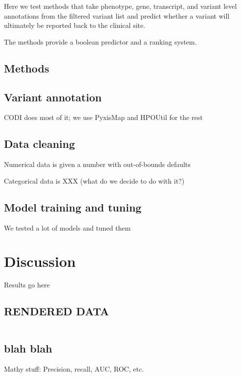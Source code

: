 \documentclass{bioinfo}
\begin{document}
Here we test methods that take phenotype, gene, transcript, and variant level annotations from the filtered variant list and predict whether a variant will ultimately be reported back to the clinical site.

The methods provide a boolean predictor and a ranking system.

\begin{methods}
\section{Methods}

\subsection{Variant annotation}
CODI does most of it; we use PyxisMap and HPOUtil for the rest

\subsection{Data cleaning}
Numerical data is given a number with out-of-bounds defaults

Categorical data is XXX (what do we decide to do with it?)

\subsection{Model training and tuning}

We tested a lot of models and tuned them

\end{methods}

\section{Discussion}
Results go here

\subsection{RENDERED DATA}
\begin{table*}
\centering
\begin{tabular}{c|c|c|c|c||c|c|c|c}

\end{tabular}
\end{table*}

\subsection{blah blah}
Mathy stuff: Precision, recall, AUC, ROC, etc.
\end{document}
